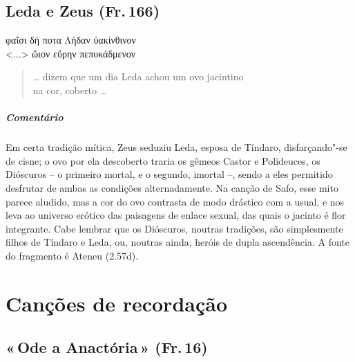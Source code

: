 \pagebreak
\section{Leda e Zeus (Fr.\,166)}

\begin{gkverse}
φαῖσι δή ποτα Λήδαν ὐακίνθινον\\
<...> ὤιον εὔρην πεπυκάδμενον
\end{gkverse}

\begin{verse}
\ldots{} dizem que um dia Leda achou um ovo jacintino\\
na cor, coberto \ldots{}
\end{verse}

\medskip

{\paragraph{Comentário} Em certa tradição mítica, Zeus seduziu Leda, esposa de Tíndaro, disfarçando"-se
de cisne; o ovo por ela descoberto traria os gêmeos Castor e Polideuces, os
Dióscuros -- o primeiro mortal, e o segundo, imortal --, sendo a eles
permitido desfrutar de ambas as condições alternadamente. Na canção de Safo,
esse mito parece aludido, mas a cor do ovo contrasta de modo drástico com a usual,
e nos leva ao universo erótico das paisagens de enlace sexual, das quais o
jacinto é flor integrante. Cabe lembrar que os Dióscuros, noutras tradições,
são simplesmente filhos de Tíndaro e Leda, ou, noutras ainda, heróis de dupla
ascendência. A fonte do fragmento é Ateneu (2.57d).}




\chapter{Canções de recordação}


\section{«\,Ode a Anactória\,» (Fr.\,16)}

